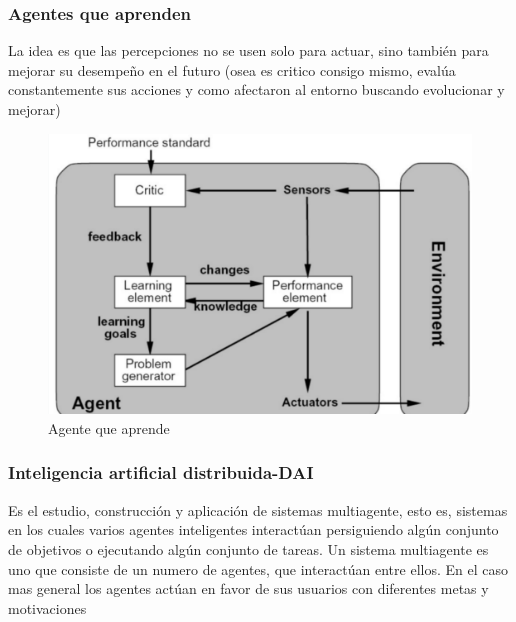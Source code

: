 \subsubsection*{Agentes que aprenden}
La idea es que las percepciones no se usen solo para actuar, sino también para mejorar su desempeño en el futuro (osea es critico consigo mismo, evalúa constantemente sus acciones y como afectaron al entorno buscando evolucionar y mejorar)

\begin{figure}
  \centering
  \includegraphics[width=16cm, scale=1]{Images/Imagenes/AgenteQueAprende.png}
  \caption{Agente que aprende}
\end{figure}

\subsubsection*{Inteligencia artificial distribuida-DAI}
Es el estudio, construcción y aplicación de sistemas multiagente, esto es, sistemas en los cuales varios agentes inteligentes interactúan persiguiendo algún conjunto de objetivos o ejecutando algún conjunto de tareas. Un sistema multiagente es uno que consiste de un numero de agentes, que interactúan entre ellos. En el caso mas general los agentes actúan en favor de sus usuarios con diferentes metas y motivaciones

